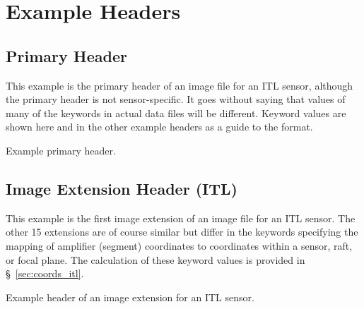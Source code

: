 \documentclass{article}[12pt]
\newcommand{\red}{\textcolor{red}}
\begin{document}
\section{Example Headers}

\subsection{Primary Header}
This example is the primary header of an image file for an ITL sensor, although the primary header is not sensor-specific.  It goes without saying that values of many of the keywords in actual data files will be different.  Keyword values are shown here and in the other example headers as a guide to the format.


\begin{table}
\begin{alltt}

\end{alltt}
\caption{Example primary header.\label{tab:primary}}
\end{table}

\subsection{Image Extension Header (ITL)}
This example is the first image extension of an image file for an ITL sensor.  The other 15 extensions are of course similar but differ in the keywords specifying the mapping of amplifier (segment) coordinates to coordinates within a sensor, raft, or focal plane.  The calculation of these keyword values is provided in \S~\ref{sec:coords_itl}.

\begin{table}
\begin{alltt}

\end{alltt}
\caption{Example header of an image extension for an ITL sensor. \label{tab:image_ITL}}
\end{table}
\end{document}
